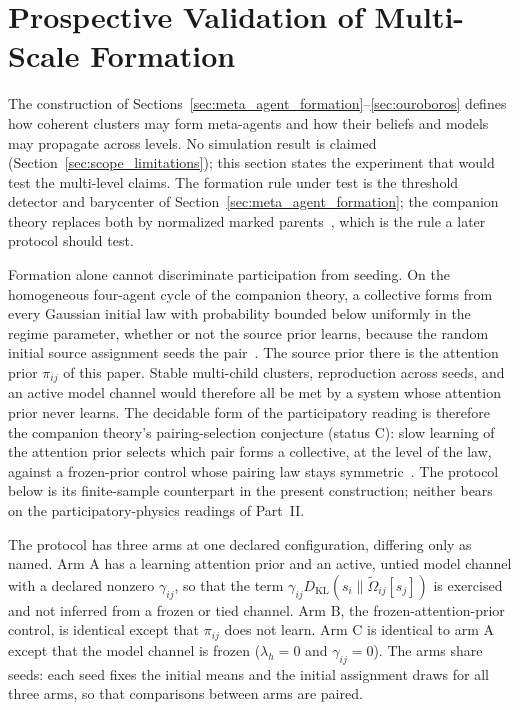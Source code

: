 \documentclass[11pt]{article}
\begin{document}
\section{Prospective Validation of Multi-Scale Formation}\label{sec:participatory}

The construction of Sections~\ref{sec:meta_agent_formation}--\ref{sec:ouroboros} defines how coherent clusters may form meta-agents and how their beliefs and models may propagate across levels. No simulation result is claimed (Section~\ref{sec:scope_limitations}); this section states the experiment that would test the multi-level claims. The formation rule under test is the threshold detector and barycenter of Section~\ref{sec:meta_agent_formation}; the companion theory replaces both by normalized marked parents~\cite[Ch.~13]{DennisGaugeVFE2026}, which is the rule a later protocol should test.

Formation alone cannot discriminate participation from seeding. On the homogeneous four-agent cycle of the companion theory, a collective forms from every Gaussian initial law with probability bounded below uniformly in the regime parameter, whether or not the source prior learns, because the random initial source assignment seeds the pair~\cite[Ch.~14, the seeded-contrast-formation proposition]{DennisGaugeVFE2026}. The source prior there is the attention prior $\pi_{ij}$ of this paper. Stable multi-child clusters, reproduction across seeds, and an active model channel would therefore all be met by a system whose attention prior never learns. The decidable form of the participatory reading is therefore the companion theory's pairing-selection conjecture (status C): slow learning of the attention prior selects which pair forms a collective, at the level of the law, against a frozen-prior control whose pairing law stays symmetric~\cite[Ch.~14, the pairing-selection conjecture]{DennisGaugeVFE2026}. The protocol below is its finite-sample counterpart in the present construction; neither bears on the participatory-physics readings of Part~II.

The protocol has three arms at one declared configuration, differing only as named. Arm A has a learning attention prior and an active, untied model channel with a declared nonzero $\gamma_{ij}$, so that the term $\gamma_{ij} D_{\mathrm{KL}}(s_i\|\tilde\Omega_{ij}[s_j])$ is exercised and not inferred from a frozen or tied channel. Arm B, the frozen-attention-prior control, is identical except that $\pi_{ij}$ does not learn. Arm C is identical to arm A except that the model channel is frozen ($\lambda_h = 0$ and $\gamma_{ij} = 0$). The arms share seeds: each seed fixes the initial means and the initial assignment draws for all three arms, so that comparisons between arms are paired.
\end{document}
